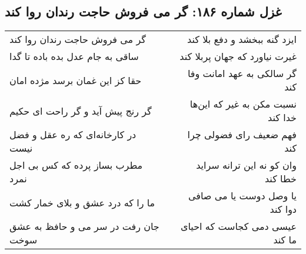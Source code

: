 \begin{center}
\section*{غزل شماره ۱۸۶: گر می فروش حاجت رندان روا کند}
\label{sec:sh186}
\begin{longtable}{l p{0.5cm} r}
گر می فروش حاجت رندان روا کند
&&
ایزد گنه ببخشد و دفع بلا کند
\\
ساقی به جام عدل بده باده تا گدا
&&
غیرت نیاورد که جهان پربلا کند
\\
حقا کز این غمان برسد مژده امان
&&
گر سالکی به عهد امانت وفا کند
\\
گر رنج پیش آید و گر راحت ای حکیم
&&
نسبت مکن به غیر که این‌ها خدا کند
\\
در کارخانه‌ای که ره عقل و فضل نیست
&&
فهم ضعیف رای فضولی چرا کند
\\
مطرب بساز پرده که کس بی اجل نمرد
&&
وان کو نه این ترانه سراید خطا کند
\\
ما را که درد عشق و بلای خمار کشت
&&
یا وصل دوست یا می صافی دوا کند
\\
جان رفت در سر می و حافظ به عشق سوخت
&&
عیسی دمی کجاست که احیای ما کند
\\
\end{longtable}
\end{center}

